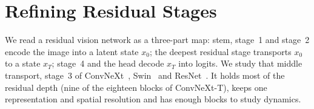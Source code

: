 \section{Refining Residual Stages}
\label{sec:method}

We read a residual vision network as a three-part map: stem, stage~1 and stage~2
encode the image into a latent state $x_0$; the deepest residual stage transports
$x_0$ to a state $x_T$; stage~4 and the head decode $x_T$ into logits.
We study that middle transport, stage~3 of ConvNeXt~\citep{liu2022convnext},
Swin~\citep{liu2021swin} and ResNet~\citep{he2016resnet}.
It holds most of the residual depth (nine of the eighteen blocks of ConvNeXt-T),
keeps one representation and spatial resolution and has enough blocks to study
dynamics.




